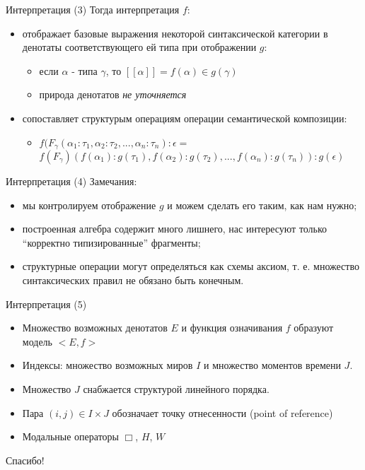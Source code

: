 \documentclass{beamer}
\begin{document}
\begin{frame}{Интерпретация (3)}
Тогда интерпретация $f$:\\
\bigskip
\begin{itemize}
  \item отображает базовые выражения некоторой синтаксической категории в денотаты соответствующего ей типа при отображении $g$:
    \begin{itemize}
      \item если $\alpha$ - типа $\gamma$, то $[ \! [ \alpha ] \! ] = f(\alpha) \in g(\gamma)$
      \item природа денотатов \textit{не уточняется}
    \end{itemize}
  \item сопоставляет структурым операциям операции семантической композиции:
    \begin{itemize}
      \item $f(F_\gamma(\alpha_1 : \tau_1, \alpha_2 : \tau_2, ... , \alpha_n : \tau_n) : \epsilon =$\\
            $f(F_\gamma)(f(\alpha_1) : g(\tau_1), f(\alpha_2) : g(\tau_2), ... , f(\alpha_n) : g(\tau_n)) : g(\epsilon)$
    \end{itemize}
\end{itemize}
\end{frame}

\begin{frame}{Интерпретация (4)}
Замечания:\\
\bigskip
\begin{itemize}
  \item мы контролируем отображение $g$ и можем сделать его таким, как нам нужно;
  \item построенная алгебра содержит много лишнего, нас интересуют только ``корректно типизированные'' фрагменты;
  \item структурные операции могут определяться как схемы аксиом, т. е. множество синтаксических правил не обязано быть конечным.
\end{itemize}
\end{frame}

\begin{frame}{Интерпретация (5)}
\begin{itemize}
  \item Множество возможных денотатов $E$ и функция означивания $f$ образуют модель $< \! E, f \!>$
  \item Индексы: множество возможных миров $I$ и множество моментов времени $J$.
  \item Множество $J$ снабжается структурой линейного порядка.
  \item Пара $(i, j) \in I \times J$ обозначает точку отнесенности (point of reference)
  \item Модальные операторы $\Box$, $H$, $W$
\end{itemize}
\end{frame}

\begin{frame}{}
    \thispagestyle{empty}
    \begin{center}
        {\large Спасибо!}
    \end{center}
\end{frame}


\end{document}
